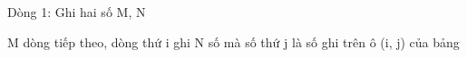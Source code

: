 Dòng 1: Ghi hai số M, N  

   M dòng tiếp theo, dòng thứ i ghi N số mà số thứ j là số ghi trên ô (i, j) của bảng